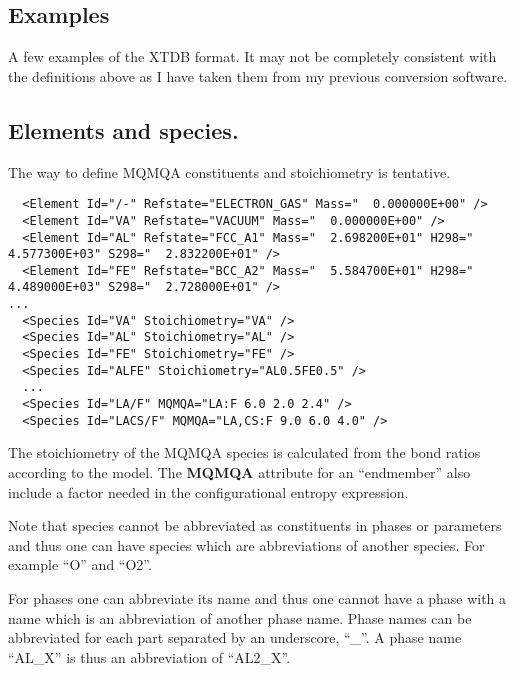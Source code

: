 \documentclass{article}
\begin{document}
\newpage
\begin{appendices}
\setcounter{equation}{0}
\renewcommand{\theequation}{A\arabic{equation}}
\setcounter{figure}{0}
\renewcommand{\thefigure}{A\arabic{figure}}

\section{Examples}\label{sec:examples}

A few examples of the XTDB format.  It may not be completely
consistent with the definitions above as I have taken them from my
previous conversion software.

\subsection{Elements and species.}\label{sec:elementexample}

The way to define MQMQA constituents and stoichiometry is tentative.

{\small
\begin{verbatim}
  <Element Id="/-" Refstate="ELECTRON_GAS" Mass="  0.000000E+00" />
  <Element Id="VA" Refstate="VACUUM" Mass="  0.000000E+00" />
  <Element Id="AL" Refstate="FCC_A1" Mass="  2.698200E+01" H298="  4.577300E+03" S298="  2.832200E+01" />
  <Element Id="FE" Refstate="BCC_A2" Mass="  5.584700E+01" H298="  4.489000E+03" S298="  2.728000E+01" />
...
  <Species Id="VA" Stoichiometry="VA" />
  <Species Id="AL" Stoichiometry="AL" />
  <Species Id="FE" Stoichiometry="FE" />
  <Species Id="ALFE" Stoichiometry="AL0.5FE0.5" />
  ...
  <Species Id="LA/F" MQMQA="LA:F 6.0 2.0 2.4" />
  <Species Id="LACS/F" MQMQA="LA,CS:F 9.0 6.0 4.0" />
\end{verbatim}
}

The stoichiometry of the MQMQA species is calculated from the bond
ratios according to the model.  The {\bf MQMQA} attribute for an
``endmember'' also include a factor needed in the configurational
entropy expression.

Note that species cannot be abbreviated as constituents in phases or
parameters and thus one can have species which are abbreviations of
another species.  For example ``O'' and ``O2''.

For phases one can abbreviate its name and thus one cannot have a
phase with a name which is an abbreviation of another phase name.
Phase names can be abbreviated for each part separated by an
underscore, ``\_''.  A phase name ``AL\_X'' is thus an abbreviation of
``AL2\_X''.


\end{appendices}
\end{document}
